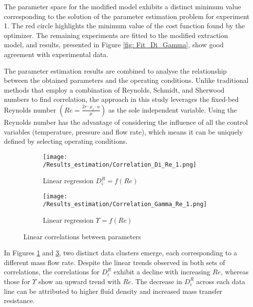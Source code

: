\documentclass[../Supercritical_fluid_extraction_of_essential_oil_from_chamomile.tex]{subfiles}
\begin{document}
	The parameter space for the modified model exhibits a distinct minimum value corresponding to the solution of the parameter estimation problem for experiment 1. The red circle highlights the minimum value of the cost function found by the optimizer. The remaining experiments are fitted to the modified extraction model, and results, presented in Figure \ref{fig: Fit_Di_Gamma}, show good agreement with experimental data. 
		
	The parameter estimation results are combined to analyse the relationship between the obtained parameters and the operating conditions. Unlike traditional methods that employ a combination of Reynolds, Schmidt, and Sherwood numbers to find correlation, the approach in this study leverages the fixed-bed Reynolds number $\left(Re = \frac{2r \cdot \rho_f \cdot u}{\mu}\right)$ as the sole independent variable. Using the Reynolds number has the advantage of considering the influence of all the control variables (temperature, pressure and flow rate), which means it can be uniquely defined by selecting operating conditions.	
	
	\begin{figure}[!h]
		\centering
		\begin{subfigure}{0.9\columnwidth}
			\centering
			\texttt{[image: /Results\_estimation/Correlation\_Di\_Re\_1.png]}
			\caption{Linear regression $D_i^R = f(Re)$}
			\label{fig: Correlations_Di_Re}
		\end{subfigure}
		\hfill
		\begin{subfigure}{0.9\columnwidth}
			\centering
			\texttt{[image: /Results\_estimation/Correlation\_Gamma\_Re\_1.png]}
			\caption{Linear regression $\Upsilon = f(Re)$}
			\label{fig: Correlations_Gamma_Re}
		\end{subfigure}
		\caption{Linear correlations between parameters}
	\end{figure}
	
	In Figures \ref{fig: Correlations_Di_Re} and \ref{fig: Correlations_Gamma_Re}, two distinct data clusters emerge, each corresponding to a different mass flow rate. Despite the linear trends observed in both sets of correlations, the correlations for $D_i^R$ exhibit a decline with increasing $Re$, whereas those for $\Upsilon$ show an upward trend with $Re$. The decrease in $D_i^R$ across each data line can be attributed to higher fluid density and increased mass transfer resistance.
	
\end{document}
